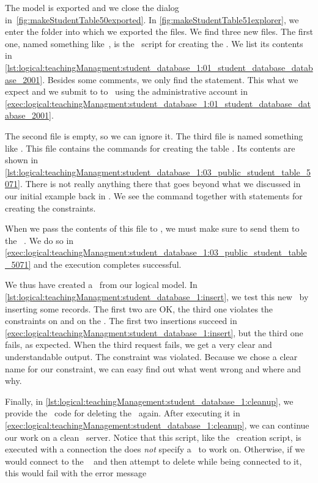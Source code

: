 The model is exported and we close the dialog in~\cref{fig:makeStudentTable50exported}.
In \cref{fig:makeStudentTable51explorer}, we enter the folder into which we exported the files.
We find three new files.
The first one, named something like~, is the \sql\ script for creating the \db.
We list its contents in \cref{lst:logical:teachingManagment:student_database_1:01_student_database_database_2001}.
Besides some comments, we only find the  statement.
This what we expect and we submit to to \sql\ using the  administrative account in \cref{exec:logical:teachingManagment:student_database_1:01_student_database_database_2001}.%
%
\begin{sloppypar}%
The second file is empty, so we can ignore it.
The third file is named something like .
This file contains the commands for creating the table .
Its contents are shown in \cref{lst:logical:teachingManagment:student_database_1:03_public_student_table_5071}.
There is not really anything there that goes beyond what we discussed in our initial example back in .
We see the  command together with statements for creating the constraints.%
\end{sloppypar}%
%
When we pass the contents of this file to \psql, we must make sure to send them to the \db\ .
We do so in \cref{exec:logical:teachingManagment:student_database_1:03_public_student_table_5071} and the execution completes successful.

We thus have created a \db\ from our logical model.
In \cref{lst:logical:teachingManagment:student_database_1:insert}, we test this new \db\ by inserting some records.
The first two are OK, the third one violates the constraints on  and on the .
The first two insertions succeed in \cref{exec:logical:teachingManagment:student_database_1:insert}, but the third one fails, as expected.
When the third request fails, we get a very clear and understandable output.
The  constraint was violated.
Because we chose a clear name for our constraint, we can easy find out what went wrong and where and why.

Finally, in \cref{lst:logical:teachingManagement:student_database_1:cleanup}, we provide the \sql\ code for deleting the \db\ again.
After executing it in \cref{exec:logical:teachingManagement:student_database_1:cleanup}, we can continue our work on a clean \postgresql\ server.
Notice that this script, like the \db\ creation script, is executed with a connection  the does \emph{not} specify a \db\ to work on.
Otherwise, if we would connect to the \db\  and then attempt to delete while being connected to it, this would fail with the error message~

